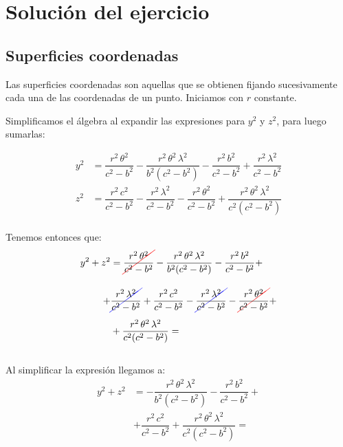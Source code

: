 \section{Solución del ejercicio}
\subsection{Superficies coordenadas}



Las superficies coordenadas son aquellas que se obtienen fijando sucesivamente cada una de las coordenadas de un punto.
Iniciamos con $r$ constante.
\par
Simplificamos el álgebra al expandir las expresiones para $y^{2}$ y $z^{2}$, para luego sumarlas:

\begin{align*}
y^{2} &= \dfrac{r^{2} \, \theta^{2}}{c^{2} - b^{2}} - \dfrac{r^{2} \, \theta^{2} \, \lambda^{2}}{b^{2}(c^{2} - b^{2})} - \dfrac{r^{2} \, b^{2}}{c^{2} - b^{2}} + \dfrac{r^{2} \, \lambda^{2}}{c^{2} - b^{2}} \\[1em] 
z^{2} &= \dfrac{r^{2} \, c^{2}}{c^{2} - b^{2}} - \dfrac{r^{2} \, \lambda^{2}}{c^{2} - b^{2}} - \dfrac{r^{2} \, \theta^{2}}{c^{2} - b^{2}} + \dfrac{r^{2} \, \theta^{2} \, \lambda^{2}}{c^{2} (c^{2} - b^{2})}
\end{align*}
\\
Tenemos entonces que:
\begin{align*}
y^{2} + z^{2} &= \Cancel[red]{\dfrac{r^{2} \, \theta^{2}}{c^{2} - b^{2}}} - \dfrac{r^{2} \, \theta^{2} \, \lambda^{2}}{b^{2}(c^{2} - b^{2})} - \dfrac{r^{2} \, b^{2}}{c^{2} - b^{2}} + \\[1em]
+& \Cancel[blue]{\dfrac{r^{2} \, \lambda^{2}}{c^{2} - b^{2}}} + \dfrac{r^{2} \, c^{2}}{c^{2} - b^{2}} - \Cancel[blue]{\dfrac{r^{2} \, \lambda^{2}}{c^{2} - b^{2}}} - \Cancel[red]{\dfrac{r^{2} \, \theta^{2}}{c^{2} - b^{2}}} + \\[0.5em]
&+ \dfrac{r^{2} \, \theta^{2} \, \lambda^{2}}{c^{2} (c^{2} - b^{2})} =
\end{align*}
\\
Al simplificar la expresión llegamos a:
\begin{align*}
y^{2} + z^{2} &= - \dfrac{r^{2} \, \theta^{2} \, \lambda^{2}}{b^{2}(c^{2} - b^{2})} - \dfrac{r^{2} \, b^{2}}{c^{2} - b^{2}} + \\[1em]
&+ \dfrac{r^{2} \, c^{2}}{c^{2} - b^{2}} + \dfrac{r^{2} \, \theta^{2} \, \lambda^{2}}{c^{2} (c^{2} - b^{2})} =
\end{align*}
\\
